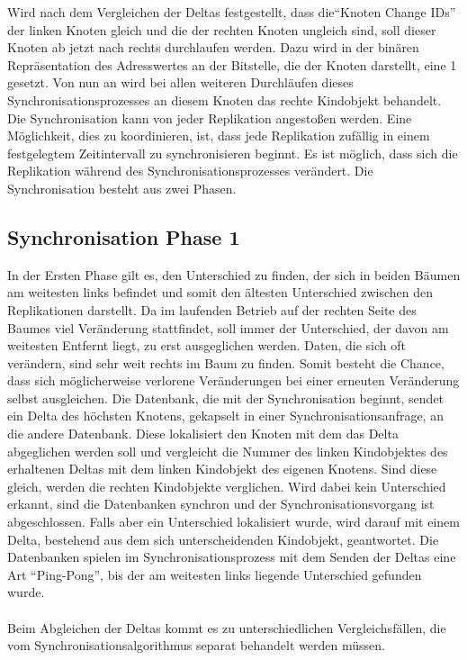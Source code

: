 \documentclass[a4paper,11pt,oneside,%
headsepline,												%
footsepline,												%
bibtotocnumbered									%
]{scrreprt}
\begin{document}
Wird nach dem Vergleichen der Deltas festgestellt, dass die\enquote{Knoten Change IDs} der linken Knoten gleich und die der rechten Knoten ungleich sind, soll dieser Knoten ab jetzt nach rechts durchlaufen werden. Dazu wird in der binären Repräsentation des Adresswertes an der Bitstelle, die der Knoten darstellt, eine 1 gesetzt. Von nun an wird bei allen weiteren Durchläufen dieses Synchronisationsprozesses an diesem Knoten das rechte Kindobjekt behandelt.
Die Synchronisation kann von jeder Replikation angestoßen werden. Eine Möglichkeit, dies zu koordinieren, ist, dass jede Replikation zufällig in einem festgelegtem Zeitintervall zu synchronisieren beginnt. Es ist möglich, dass sich die Replikation während des Synchronisationsprozesses verändert. Die Synchronisation besteht aus zwei Phasen.  
\subsection{Synchronisation Phase 1} 
In der Ersten Phase gilt es, den Unterschied zu finden, der sich in beiden Bäumen am weitesten links befindet und somit den ältesten Unterschied zwischen den Replikationen darstellt. Da im laufenden Betrieb auf der rechten Seite des Baumes viel Veränderung stattfindet, soll immer der Unterschied, der davon am weitesten Entfernt liegt, zu erst ausgeglichen werden. Daten, die sich oft verändern, sind sehr weit rechts im Baum zu finden. Somit besteht die Chance, dass sich möglicherweise verlorene Veränderungen bei einer erneuten Veränderung selbst ausgleichen.
Die Datenbank, die mit der Synchronisation beginnt, sendet ein Delta des höchsten Knotens, gekapselt in einer Synchronisationsanfrage, an die andere Datenbank. Diese lokalisiert den Knoten mit dem das Delta abgeglichen werden soll und vergleicht die Nummer des linken Kindobjektes des erhaltenen Deltas mit dem linken Kindobjekt des eigenen Knotens. Sind diese gleich, werden die rechten Kindobjekte verglichen. Wird dabei kein Unterschied erkannt, sind die Datenbanken synchron und der Synchronisationsvorgang ist abgeschlossen. Falls aber ein Unterschied lokalisiert wurde, wird darauf mit einem Delta, bestehend aus dem sich unterscheidenden Kindobjekt, geantwortet. Die Datenbanken spielen im Synchronisationsprozess mit dem Senden der Deltas eine Art \enquote{Ping-Pong}, bis der am weitesten links liegende Unterschied gefunden wurde.\\\\
Beim Abgleichen der Deltas kommt es zu unterschiedlichen Vergleichsfällen, die vom Synchronisationsalgorithmus separat behandelt werden müssen.
\end{document}
